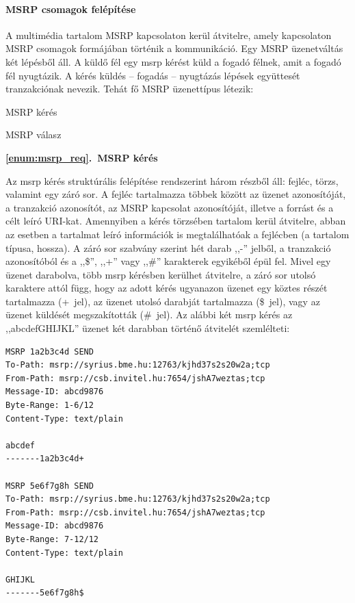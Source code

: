 \paragraph{MSRP csomagok felépítése\\}
\label{sec:msrp_chunks}

A multimédia tartalom MSRP kapcsolaton kerül átvitelre, amely kapcsolaton MSRP csomagok formájában történik a kommunikáció. Egy MSRP üzenetváltás két lépésből áll. A küldő fél egy msrp kérést küld a fogadó félnek, amit a fogadó fél nyugtázik. A kérés küldés -- fogadás -- nyugtázás lépések együttesét tranzakciónak nevezik. Tehát fő MSRP üzenettípus létezik:
\begin{myenumerate}
\item \label{enum:msrp_req} MSRP kérés
\item \label{enum:msrp_resp} MSRP válasz
\end{myenumerate}
\bigskip

\noindent
{\bf \ref{enum:msrp_req}.~MSRP kérés}

Az msrp kérés struktúrális felépítése rendszerint három részből áll: fejléc, törzs, valamint egy záró sor. A fejléc tartalmazza többek között az üzenet azonosítóját, a tranzakció azonosítót, az MSRP kapcsolat azonosítóját, illetve a forrást és a célt leíró URI-kat. Amennyiben a kérés törzsében tartalom kerül átvitelre, abban az esetben a tartalmat leíró információk is megtalálhatóak a fejlécben (a tartalom típusa, hossza). A záró sor szabvány szerint hét darab ,,-'' jelből, a tranzakció azonosítóból és a ,,\$'', ,,+'' vagy ,,\#'' karakterek egyikéből épül fel. Mivel egy üzenet darabolva, több msrp kérésben kerülhet átvitelre, a záró sor utolsó karaktere attól függ, hogy az adott kérés ugyanazon üzenet egy köztes részét tartalmazza (+~jel), az üzenet utolsó darabját tartalmazza (\$~jel), vagy az üzenet küldését megszakították (\#~jel). Az alábbi két msrp kérés az ,,abcdefGHIJKL'' üzenet két darabban történő átvitelét szemlélteti:

\fontsize{10}{10}
\begin{verbatim}
MSRP 1a2b3c4d SEND
To-Path: msrp://syrius.bme.hu:12763/kjhd37s2s20w2a;tcp
From-Path: msrp://csb.invitel.hu:7654/jshA7weztas;tcp
Message-ID: abcd9876
Byte-Range: 1-6/12
Content-Type: text/plain

abcdef
-------1a2b3c4d+

MSRP 5e6f7g8h SEND
To-Path: msrp://syrius.bme.hu:12763/kjhd37s2s20w2a;tcp
From-Path: msrp://csb.invitel.hu:7654/jshA7weztas;tcp
Message-ID: abcd9876
Byte-Range: 7-12/12
Content-Type: text/plain

GHIJKL
-------5e6f7g8h$
\end{verbatim}
\fontsize{12}{12} 

